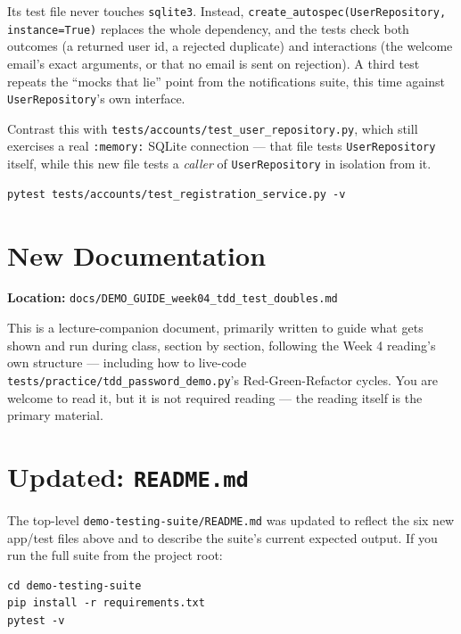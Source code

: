 \documentclass[11pt]{article}
\begin{document}
Its test file never touches \texttt{sqlite3}. Instead,
\texttt{create\_autospec(UserRepository, instance=True)} replaces the
whole dependency, and the tests check both outcomes (a returned user id,
a rejected duplicate) and interactions (the welcome email's exact
arguments, or that no email is sent on rejection). A third test repeats
the ``mocks that lie'' point from the notifications suite, this time
against \texttt{UserRepository}'s own interface.

\begin{tipbox}
Contrast this with \texttt{tests/accounts/test\_user\_repository.py},
which still exercises a real \texttt{:memory:} SQLite connection ---
that file tests \texttt{UserRepository} itself, while this new file
tests a \emph{caller} of \texttt{UserRepository} in isolation from it.
\begin{lstlisting}[style=shellstyle]
pytest tests/accounts/test_registration_service.py -v
\end{lstlisting}
\end{tipbox}

\section{New Documentation}
\textbf{Location:} \texttt{docs/DEMO\_GUIDE\_week04\_tdd\_test\_doubles.md}

This is a lecture-companion document, primarily written to guide what
gets shown and run during class, section by section, following the
Week 4 reading's own structure --- including how to live-code
\texttt{tests/practice/tdd\_password\_demo.py}'s Red-Green-Refactor
cycles. You are welcome to read it, but it is not required reading ---
the reading itself is the primary material.

\section{Updated: \texttt{README.md}}
The top-level \texttt{demo-testing-suite/README.md} was updated to
reflect the six new app/test files above and to describe the suite's
current expected output. If you run the full suite from the project
root:

\begin{lstlisting}[style=shellstyle]
cd demo-testing-suite
pip install -r requirements.txt
pytest -v
\end{lstlisting}
\end{document}
